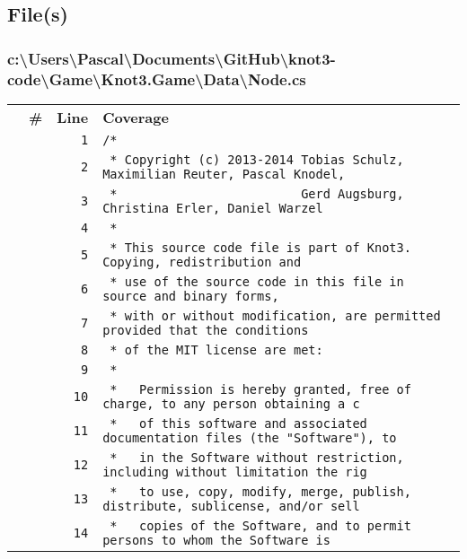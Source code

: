 \documentclass[a4paper,10pt]{article}
\begin{document}
\subsection{File(s)}
\subsubsection{c:\textbackslash Users\textbackslash Pascal\textbackslash Documents\textbackslash GitHub\textbackslash knot3-code\textbackslash Game\textbackslash Knot3.Game\textbackslash Data\textbackslash Node.cs}
\begin{longtable}[l]{lrrl}
\textbf{} & \textbf{\#} & \textbf{Line} & \textbf{Coverage}\\
\cellcolor{gray} &  & \verb~1~ & \verb~/*~\\
\cellcolor{gray} &  & \verb~2~ & \verb~ * Copyright (c) 2013-2014 Tobias Schulz, Maximilian Reuter, Pascal Knodel,~\\
\cellcolor{gray} &  & \verb~3~ & \verb~ *                         Gerd Augsburg, Christina Erler, Daniel Warzel~\\
\cellcolor{gray} &  & \verb~4~ & \verb~ *~\\
\cellcolor{gray} &  & \verb~5~ & \verb~ * This source code file is part of Knot3. Copying, redistribution and~\\
\cellcolor{gray} &  & \verb~6~ & \verb~ * use of the source code in this file in source and binary forms,~\\
\cellcolor{gray} &  & \verb~7~ & \verb~ * with or without modification, are permitted provided that the conditions~\\
\cellcolor{gray} &  & \verb~8~ & \verb~ * of the MIT license are met:~\\
\cellcolor{gray} &  & \verb~9~ & \verb~ *~\\
\cellcolor{gray} &  & \verb~10~ & \verb~ *   Permission is hereby granted, free of charge, to any person obtaining a c~\\
\cellcolor{gray} &  & \verb~11~ & \verb~ *   of this software and associated documentation files (the "Software"), to ~\\
\cellcolor{gray} &  & \verb~12~ & \verb~ *   in the Software without restriction, including without limitation the rig~\\
\cellcolor{gray} &  & \verb~13~ & \verb~ *   to use, copy, modify, merge, publish, distribute, sublicense, and/or sell~\\
\cellcolor{gray} &  & \verb~14~ & \verb~ *   copies of the Software, and to permit persons to whom the Software is~\\

\end{longtable}
\end{document}
